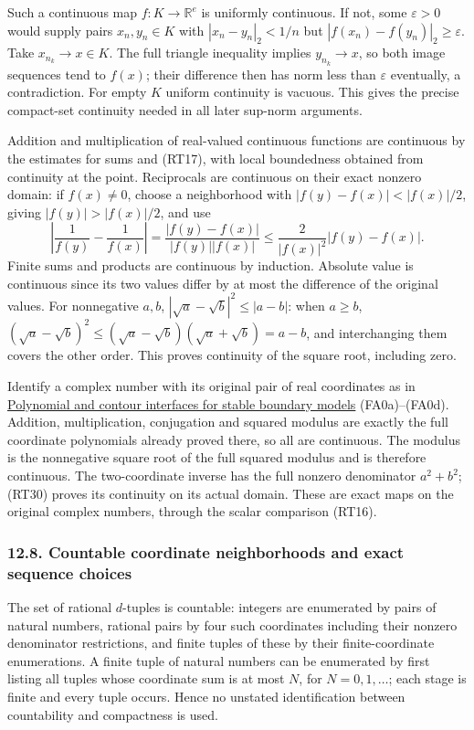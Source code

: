 \documentclass[
  11pt,
]{article}
\begin{document}
Such a continuous map \(f:K\to\mathbb R^e\) is uniformly continuous. If
not, some \(\varepsilon>0\) would supply pairs \(x_n,y_n\in K\) with
\(|x_n-y_n|_2<1/n\) but \(|f(x_n)-f(y_n)|_2\ge\varepsilon\). Take
\(x_{n_k}\to x\in K\). The full triangle inequality implies
\(y_{n_k}\to x\), so both image sequences tend to \(f(x)\); their
difference then has norm less than \(\varepsilon\) eventually, a
contradiction. For empty \(K\) uniform continuity is vacuous. This gives
the precise compact-set continuity needed in all later sup-norm
arguments.

Addition and multiplication of real-valued continuous functions are
continuous by the estimates for sums and (RT17), with local boundedness
obtained from continuity at the point. Reciprocals are continuous on
their exact nonzero domain: if \(f(x)\ne0\), choose a neighborhood with
\(|f(y)-f(x)|<|f(x)|/2\), giving \(|f(y)|>|f(x)|/2\), and use \[
\left|\frac1{f(y)}-\frac1{f(x)}\right|
=\frac{|f(y)-f(x)|}{|f(y)||f(x)|}
\le \frac{2}{|f(x)|^2}|f(y)-f(x)|.
\tag{RT30}
\] Finite sums and products are continuous by induction. Absolute value
is continuous since its two values differ by at most the difference of
the original values. For nonnegative \(a,b\),
\(|\sqrt a-\sqrt b|^2\le |a-b|\): when \(a\ge b\),
\((\sqrt a-\sqrt b)^2\le(\sqrt a-\sqrt b)(\sqrt a+\sqrt b)=a-b\), and
interchanging them covers the other order. This proves continuity of the
square root, including zero.

Identify a complex number with its original pair of real coordinates as
in \href{stable-prerequisite-bridges.pdf}{Polynomial and contour
interfaces for stable boundary models} (FA0a)--(FA0d). Addition,
multiplication, conjugation and squared modulus are exactly the full
coordinate polynomials already proved there, so all are continuous. The
modulus is the nonnegative square root of the full squared modulus and
is therefore continuous. The two-coordinate inverse has the full nonzero
denominator \(a^2+b^2\); (RT30) proves its continuity on its actual
domain. These are exact maps on the original complex numbers, through
the scalar comparison (RT16).

\subsubsection{12.8. Countable coordinate neighborhoods and exact
sequence
choices}\label{countable-coordinate-neighborhoods-and-exact-sequence-choices}

The set of rational \(d\)-tuples is countable: integers are enumerated
by pairs of natural numbers, rational pairs by four such coordinates
including their nonzero denominator restrictions, and finite tuples of
these by their finite-coordinate enumerations. A finite tuple of natural
numbers can be enumerated by first listing all tuples whose coordinate
sum is at most \(N\), for \(N=0,1,\ldots\); each stage is finite and
every tuple occurs. Hence no unstated identification between
countability and compactness is used.
\end{document}
